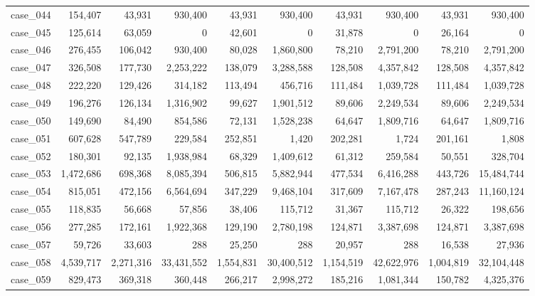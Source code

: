 \begin{footnotesize}
\begin{longtable}{l r rr rr rr rr}
case\_044 & 154{,}407 & 43{,}931 & 930{,}400 & 43{,}931 & 930{,}400 & 43{,}931 & 930{,}400 & 43{,}931 & 930{,}400 \\
case\_045 & 125{,}614 & 63{,}059 & 0 & 42{,}601 & 0 & 31{,}878 & 0 & 26{,}164 & 0 \\
case\_046 & 276{,}455 & 106{,}042 & 930{,}400 & 80{,}028 & 1{,}860{,}800 & 78{,}210 & 2{,}791{,}200 & 78{,}210 & 2{,}791{,}200 \\
case\_047 & 326{,}508 & 177{,}730 & 2{,}253{,}222 & 138{,}079 & 3{,}288{,}588 & 128{,}508 & 4{,}357{,}842 & 128{,}508 & 4{,}357{,}842 \\
case\_048 & 222{,}220 & 129{,}426 & 314{,}182 & 113{,}494 & 456{,}716 & 111{,}484 & 1{,}039{,}728 & 111{,}484 & 1{,}039{,}728 \\
case\_049 & 196{,}276 & 126{,}134 & 1{,}316{,}902 & 99{,}627 & 1{,}901{,}512 & 89{,}606 & 2{,}249{,}534 & 89{,}606 & 2{,}249{,}534 \\
case\_050 & 149{,}690 & 84{,}490 & 854{,}586 & 72{,}131 & 1{,}528{,}238 & 64{,}647 & 1{,}809{,}716 & 64{,}647 & 1{,}809{,}716 \\
case\_051 & 607{,}628 & 547{,}789 & 229{,}584 & 252{,}851 & 1{,}420 & 202{,}281 & 1{,}724 & 201{,}161 & 1{,}808 \\
case\_052 & 180{,}301 & 92{,}135 & 1{,}938{,}984 & 68{,}329 & 1{,}409{,}612 & 61{,}312 & 259{,}584 & 50{,}551 & 328{,}704 \\
case\_053 & 1{,}472{,}686 & 698{,}368 & 8{,}085{,}394 & 506{,}815 & 5{,}882{,}944 & 477{,}534 & 6{,}416{,}288 & 443{,}726 & 15{,}484{,}744 \\
case\_054 & 815{,}051 & 472{,}156 & 6{,}564{,}694 & 347{,}229 & 9{,}468{,}104 & 317{,}609 & 7{,}167{,}478 & 287{,}243 & 11{,}160{,}124 \\
case\_055 & 118{,}835 & 56{,}668 & 57{,}856 & 38{,}406 & 115{,}712 & 31{,}367 & 115{,}712 & 26{,}322 & 198{,}656 \\
case\_056 & 277{,}285 & 172{,}161 & 1{,}922{,}368 & 129{,}190 & 2{,}780{,}198 & 124{,}871 & 3{,}387{,}698 & 124{,}871 & 3{,}387{,}698 \\
case\_057 & 59{,}726 & 33{,}603 & 288 & 25{,}250 & 288 & 20{,}957 & 288 & 16{,}538 & 27{,}936 \\
case\_058 & 4{,}539{,}717 & 2{,}271{,}316 & 33{,}431{,}552 & 1{,}554{,}831 & 30{,}400{,}512 & 1{,}154{,}519 & 42{,}622{,}976 & 1{,}004{,}819 & 32{,}104{,}448 \\
case\_059 & 829{,}473 & 369{,}318 & 360{,}448 & 266{,}217 & 2{,}998{,}272 & 185{,}216 & 1{,}081{,}344 & 150{,}782 & 4{,}325{,}376 \\

\end{longtable}
\end{footnotesize}
